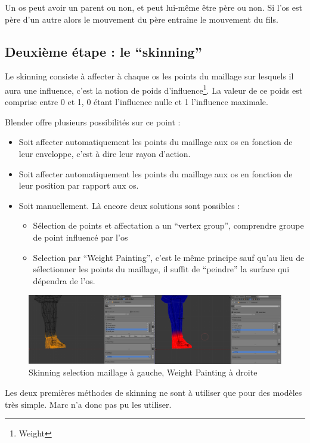 \documentclass[11pt]{report}
\begin{document}
Un os peut avoir un parent ou non, et peut lui-même être père ou non. Si l’os est père d’un autre alors le mouvement du père entraine le mouvement du fils.

\subsection{Deuxième étape : le ``skinning''}

Le skinning consiste à affecter à chaque os les points du maillage sur lesquels il aura une influence, c’est la notion de poids d’influence\footnote{Weight}. La valeur de ce poids est comprise entre 0 et 1, 0 étant l’influence nulle et 1 l’influence maximale.

Blender offre plusieurs possibilités sur ce point :

\begin{itemize}
\item Soit affecter automatiquement les points du maillage aux os en  fonction de leur enveloppe, c’est à dire leur rayon d’action.
\item Soit affecter automatiquement les points du maillage aux os en  fonction de leur position par rapport aux os.
\item Soit manuellement. Là encore deux solutions sont possibles :
\begin{itemize}
	\item Sélection de points et affectation a un ``vertex group'', comprendre groupe de point influencé par l’os
	\item Selection par ``Weight Painting'', c’est le même principe sauf qu’au lieu de sélectionner les points du maillage, il suffit de ``peindre'' la surface qui dépendra de l’os.
\end{itemize}
\end{itemize}

\begin{figure}[htbp]
\centering
\includegraphics[scale=0.8]{skinning.png}
\caption{Skinning selection maillage à gauche, Weight Painting à droite}
\end{figure}

Les deux premières méthodes de skinning ne sont à utiliser que pour des modèles très simple. Marc n’a donc pas pu les utiliser.
\end{document}
